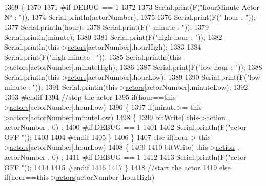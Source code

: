 \begin{DoxyCode}
1369 \{
1370 
1371 \textcolor{preprocessor}{#if DEBUG == 1}
1372 
1373     Serial.print(F(\textcolor{stringliteral}{"hourMinute Actor N° : "}));
1374     Serial.println(actorNumber);
1375 
1376     Serial.print(F(\textcolor{stringliteral}{" hour : "}));
1377     Serial.println(hour);
1378     Serial.print(F(\textcolor{stringliteral}{" minute : "}));
1379     Serial.println(minute);
1380 
1381     Serial.print(F(\textcolor{stringliteral}{"high hour : "}));
1382     Serial.println(this->\hyperlink{class_jetpack_a7e16d2f97837f9712a2e6de1c50d99db}{actors}[actorNumber].hourHigh);
1383 
1384     Serial.print(F(\textcolor{stringliteral}{"high minute : "}));
1385     Serial.println(this->\hyperlink{class_jetpack_a7e16d2f97837f9712a2e6de1c50d99db}{actors}[actorNumber].minuteHigh);
1386 
1387     Serial.print(F(\textcolor{stringliteral}{"low hour : "}));
1388     Serial.println(this->\hyperlink{class_jetpack_a7e16d2f97837f9712a2e6de1c50d99db}{actors}[actorNumber].hourLow);
1389 
1390     Serial.print(F(\textcolor{stringliteral}{"low minute : "}));
1391     Serial.println(this->\hyperlink{class_jetpack_a7e16d2f97837f9712a2e6de1c50d99db}{actors}[actorNumber].minuteLow);
1392 
1393 \textcolor{preprocessor}{#endif}
1394     \textcolor{comment}{//stop the actor}
1395     \textcolor{keywordflow}{if}(hour==this->\hyperlink{class_jetpack_a7e16d2f97837f9712a2e6de1c50d99db}{actors}[actorNumber].hourLow)
1396     \{
1397         \textcolor{keywordflow}{if}(minute>= this->\hyperlink{class_jetpack_a7e16d2f97837f9712a2e6de1c50d99db}{actors}[actorNumber].minuteLow)
1398         \{
1399             bitWrite( this->\hyperlink{class_jetpack_aca3142925a7b0834b34ae91d26af7765}{action} , actorNumber , 0) ;
1400 \textcolor{preprocessor}{        #if DEBUG == 1 }
1401 
1402             Serial.println(F(\textcolor{stringliteral}{"actor OFF "}));
1403 
1404 \textcolor{preprocessor}{        #endif  }
1405         \}
1406     \}
1407     \textcolor{keywordflow}{else} \textcolor{keywordflow}{if}(hour > this->\hyperlink{class_jetpack_a7e16d2f97837f9712a2e6de1c50d99db}{actors}[actorNumber].hourLow)
1408     \{
1409 
1410         bitWrite( this->\hyperlink{class_jetpack_aca3142925a7b0834b34ae91d26af7765}{action} , actorNumber , 0) ;
1411 \textcolor{preprocessor}{    #if DEBUG == 1 }
1412 
1413         Serial.println(F(\textcolor{stringliteral}{"actor OFF "}));
1414 
1415 \textcolor{preprocessor}{    #endif  }
1416     
1417     \}
1418     \textcolor{comment}{//start the actor}
1419     \textcolor{keywordflow}{else} \textcolor{keywordflow}{if}(hour==this->\hyperlink{class_jetpack_a7e16d2f97837f9712a2e6de1c50d99db}{actors}[actorNumber].hourHigh)

\end{DoxyCode}
